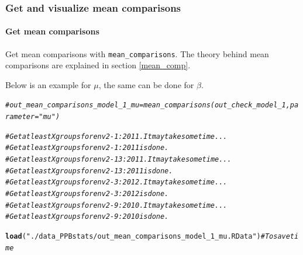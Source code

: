 \documentclass{article}\usepackage[]{graphicx}\usepackage[]{color}
\makeatletter
\newcommand{\hlstr}[1]{\textcolor[rgb]{0.192,0.494,0.8}{#1}}%
\newcommand{\hlcom}[1]{\textcolor[rgb]{0.678,0.584,0.686}{\textit{#1}}}%
\newcommand{\hlstd}[1]{\textcolor[rgb]{0.345,0.345,0.345}{#1}}%
\newcommand{\hlkwd}[1]{\textcolor[rgb]{0.737,0.353,0.396}{\textbf{#1}}}%
\newenvironment{kframe}{%
 \def\at@end@of@kframe{}%
 \ifinner\ifhmode%
  \def\at@end@of@kframe{\end{minipage}}%
  \begin{minipage}{\columnwidth}%
 \fi\fi%
 \def\FrameCommand##1{\hskip\@totalleftmargin \hskip-\fboxsep
 \colorbox{shadecolor}{##1}\hskip-\fboxsep
     \hskip-\linewidth \hskip-\@totalleftmargin \hskip\columnwidth}%
 \MakeFramed {\advance\hsize-\width
   \@totalleftmargin\z@ \linewidth\hsize
   \@setminipage}}%
 {\par\unskip\endMakeFramed%
 \at@end@of@kframe}
\newenvironment{knitrout}{}{} %
\makeatother
\begin{document}
\subsubsection{Get and visualize mean comparisons}

\paragraph{Get mean comparisons}

Get mean comparisons with \texttt{mean\_comparisons}.
The theory behind mean comparisons are explained in section \ref{mean_comp}.

Below is an example for $\mu$, the same can be done for $\beta$.

\begin{knitrout}
\color{fgcolor}\begin{kframe}
\begin{alltt}
\hlcom{# out_mean_comparisons_model_1_mu = mean_comparisons(out_check_model_1, parameter = "mu")}

\hlcom{# Get at least X groups for env2-1:2011. It may take some time ...}
\hlcom{# Get at least X groups for env2-1:2011 is done.}
\hlcom{# Get at least X groups for env2-13:2011. It may take some time ...}
\hlcom{# Get at least X groups for env2-13:2011 is done.}
\hlcom{# Get at least X groups for env2-3:2012. It may take some time ...}
\hlcom{# Get at least X groups for env2-3:2012 is done.}
\hlcom{# Get at least X groups for env2-9:2010. It may take some time ...}
\hlcom{# Get at least X groups for env2-9:2010 is done.}

\hlkwd{load}\hlstd{(}\hlstr{"./data_PPBstats/out_mean_comparisons_model_1_mu.RData"}\hlstd{)} \hlcom{# To save time}
\end{alltt}
\end{kframe}
\end{knitrout}
\end{document}
